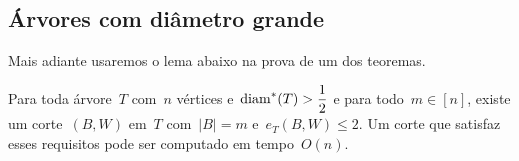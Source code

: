 

	\bigskip
	




	\subsection{Árvores com diâmetro grande}

	Mais adiante usaremos  	o lema abaixo na prova de 
	um dos teoremas.

	\begin{lem}
	\label{lema:caminhoLongo}
		Para toda árvore~$T$ com~$n$ 
		vértices e~${\mathrm{diam}^*(T)>\dfrac{1}{2}}$
		e para todo~${m\in[n]}$, existe um corte~$(B,W)$ em~$T$
		com~${|B|=m}$ e~${e_T(B,W)\le 2}$. Um corte que satisfaz esses
		requisitos pode ser computado em tempo~$O(n)$.
	\end{lem}

	\medskip
	\medskip

